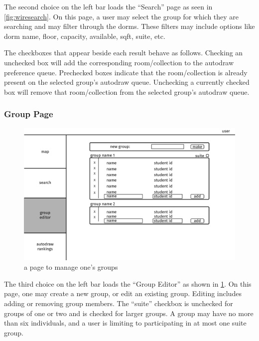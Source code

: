 The second choice on the left bar loads the ``Search'' page as seen in
\cref{fig:wiresearch}. On this page, a user may select the group for which
they are searching and may filter through the dorms. These filters may include
options like dorm name, floor, capacity, available, sqft, suite, etc.

The checkboxes that appear beside each result behave as follows. Checking an
unchecked box will add the corresponding room/collection to the autodraw
preference queue. Prechecked boxes indicate that the room/collection is already
present on the selected group's autodraw queue. Unchecking a currently checked
box will remove that room/collection from the selected group's autodraw queue.


\subsubsection{Group Page}
\begin{figure} \centering
\includegraphics[scale=.15]{wireframe/group}
\caption{a page to manage one's groups}
\label{fig:wiregroup}
\end{figure}

The third choice on the left bar loads the ``Group Editor'' as shown in
\cref{fig:wiregroup}. On this page, one may create a new group, or edit an
existing group. Editing includes adding or removing group members. The ``suite''
checkbox is unchecked for groups of one or two and is checked for larger groups.
A group may have no more than six individuals, and a user is limiting to
participating in at most one suite group.

